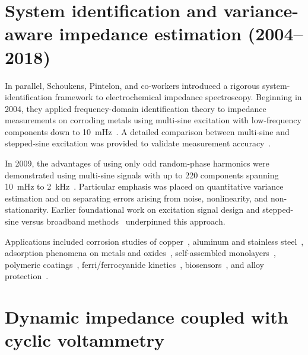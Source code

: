\section*{System identification and variance-aware impedance estimation (2004--2018)}

In parallel, Schoukens, Pintelon, and co-workers introduced a rigorous system-identification framework to electrochemical impedance spectroscopy.
Beginning in 2004, they applied frequency-domain identification theory to impedance measurements on corroding metals using multi-sine excitation with low-frequency components down to 10~mHz~\cite{vangheemElectrochemicalImpedanceSpectroscopy2004a, vangheemElectrochemicalImpedanceSpectroscopy2006a, blajievImprovementImpedanceMeasurement2006}.
A detailed comparison between multi-sine and stepped-sine excitation was provided to validate measurement accuracy~\cite{vangheemInstantaneousImpedanceMeasurements2004}.

In 2009, the advantages of using only odd random-phase harmonics were demonstrated using multi-sine signals with up to 220 components spanning 10~mHz to 2~kHz~\cite{vaningelgemAdvantagesOddRandom2009}.
Particular emphasis was placed on quantitative variance estimation and on separating errors arising from noise, nonlinearity, and non-stationarity.
Earlier foundational work on excitation signal design and stepped-sine versus broadband methods~\cite{schoukensBroadbandSteppedSine1999, schoukensSurveyExcitationSignals1988a} underpinned this approach.

Applications included corrosion studies of copper~\cite{vaningelgemApplicationMultisineImpedance2008}, aluminum and stainless steel~\cite{breugelmansOddRandomPhase2010a, alvarez-pampliegaCorrosionStudyAlrich2014, jiOddRandomPhase2018, jiElectrochemicalRamanAnalysis2020}, adsorption phenomena on metals and oxides~\cite{blajievPotentiodynamicEISInvestigation2008, geboesInvestigationAdsorptionMechanism2015, hauffmanMeasuringAdsorptionEthanol2012}, self-assembled monolayers~\cite{hauffmanDynamicSituStudy2013, fernandezmaciaStudyElectronTransfer2014}, polymeric coatings~\cite{jorcinInvestigationSelfhealingProperties2010, breugelmansOddRandomPhase2010, woutersMonitoringInitialContact2021, meeusenFEMModellingPredict2023, madelatSituMonitoringLateral2023}, ferri/ferrocyanide kinetics~\cite{fernandezmaciaORPEISStudyTime2015}, biosensors~\cite{pauwelsNewMultisinebasedImpedimetric2016}, and alloy protection~\cite{meeusenUseOddRandom2018}.

\section*{Dynamic impedance coupled with cyclic voltammetry}

